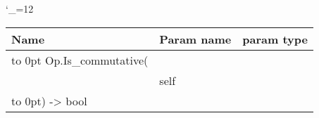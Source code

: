 \begingroup \catcode`\_=12 \tt
\begin{tabular}{lll}
\toprule
\textrm{Name}&\textrm{Param name}&\textrm{param type}\\
\midrule
\hbox to 0pt {Op.Is_commutative(\hss}\\
& self\\
\hbox to 0pt{) -> bool\hss}\\
\bottomrule
\end{tabular}
\endgroup
